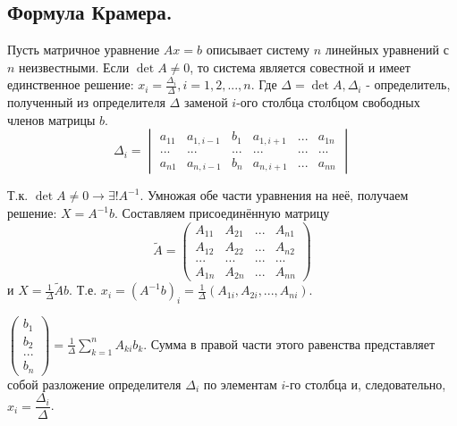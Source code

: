 \documentclass[a4paper,14pt]{article}
\begin{document}
\subsection{Формула Крамера.}
Пусть матричное уравнение $Ax=b$ описывает систему $n$ линейных уравнений с $n$ неизвестными. Если $\det A \ne 0$, то система является совестной и имеет единственное решение: $x_i = \frac{\Delta_i}{\Delta}, i=1,2,...,n$. Где $\Delta = \det A, \Delta_i$ - определитель, полученный из определителя $\Delta$ заменой $i$-ого столбца столбцом свободных членов матрицы $b$.
\[
\Delta_i=
\begin{vmatrix}
a_{11} & a_{1, i-1} & b_1 & a_{1, i+1} & ... & a_{1n} \\
... & ... & ... & ... & ... & ... \\
a_{n1} & a_{n, i-1} & b_n & a_{n, i+1} & ... & a_{nn}
\end{vmatrix}
\]
\begin{evidence}
	Т.к. $\det A \ne 0 \rightarrow \exists ! A^{-1}$. Умножая обе части уравнения на неё, получаем решение: $X=A^{-1}b$. Составляем присоединённую матрицу
	\[
	\tilde{A} = 
	\begin{pmatrix}
	A_{11} & A_{21} & ... & A_{n1} \\
	A_{12} & A_{22} & ... & A_{n2} \\
	... & ... & ... & ... \\
	A_{1n} & A_{2n} & ... & A_{nn}
	\end{pmatrix}
	\] и $X = \frac{1}{\Delta} \tilde{A}b$. Т.е. $x_i = (A^{-1}b)_i = \frac{1}{\Delta}(A_{1i}, A_{2i}, ..., A_{ni})$.
	
	\noindent $\begin{pmatrix}b_1 \\ b_2 \\ ... \\ b_n\end{pmatrix} = \frac{1}{\Delta} \sum\limits_{k=1}^nA_{ki}b_k$. Сумма в правой части этого равенства представляет собой разложение определителя $\Delta_i$ по элементам $i$-го столбца и, следовательно, $x_i = \dfrac{\Delta_i}{\Delta}$.
\end{evidence}
\end{document}
